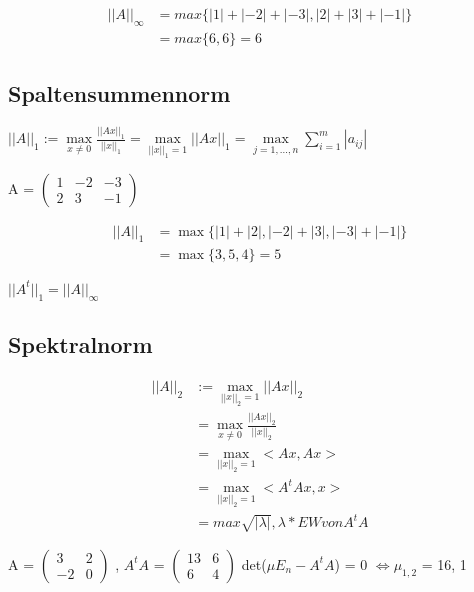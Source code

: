 \documentclass[12pt,a4paper]{article} %
\begin{document}
	\begin{equation*}
		\begin{split}		
			||A||_\infty & = max\{|1| + |-2| + |-3|, |2| + |3| + |-1|\} \\
			& = max\{6, 6\} = 6
		\end{split}
	\end{equation*}
	
	\subsection{Spaltensummennorm}
	
	$||A||_1 := \max\limits_{x \ne 0} \frac{||Ax||_1}{||x||_1} = \max\limits_{||x||_1 = 1} ||Ax||_1 = \max\limits_{j = 1, ..., n} \sum\limits_{i = 1}^{m}|a_{ij}|$
	
	A = 
	$\begin{pmatrix}
		1 & -2 & -3 \\
		2 & 3 & -1
	\end{pmatrix}$
	
	\begin{equation*}
		\begin{split}		
			||A||_1 & = \max\{|1| + |2|, |-2| + |3|, |-3| + |-1|\}  \\
			& = \max\{3, 5, 4\} = 5
		\end{split}
	\end{equation*}
	
	$||A^t||_1 = ||A||_\infty$
	
	\subsection{Spektralnorm}

	\begin{equation*}
		\begin{split}
			||A||_2 &:= \max\limits_{||x||_2 = 1} ||Ax||_2 \\
			& = \max\limits_{x \ne 0} \frac{||Ax||_2}{||x||_2} \\
			& = \max\limits_{||x||_2 = 1} <Ax, Ax> \\
			& = \max\limits_{||x||_2 = 1} <A^tAx, x> \\
			& = max{\sqrt{|\lambda |}, \lambda * EW von A^tA}
		\end{split}
	\end{equation*}
	
	A = 
	$\begin{pmatrix}
		3 & 2 \\
		-2 & 0 
	\end{pmatrix}$
	, $A^tA$ = 
	$\begin{pmatrix}
		13 & 6 \\
		6 & 4 
	\end{pmatrix}$
	det($\mu E_n - A^tA$) = 0 $\Leftrightarrow \mu_{1, 2}$ = {16, 1}
	
\end{document}
